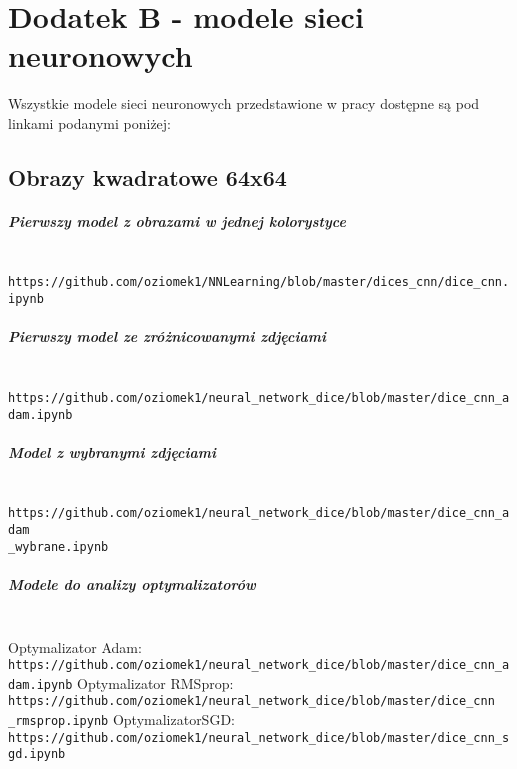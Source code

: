 
\chapter{Dodatek B - modele sieci neuronowych}

Wszystkie modele sieci neuronowych przedstawione w pracy dostępne są pod linkami
podanymi poniżej:
\section{Obrazy kwadratowe 64x64}
\paragraph{Pierwszy model z obrazami w jednej kolorystyce} \mbox{}\\
\texttt{https://github.com/oziomek1/NNLearning/blob/master/dices\_cnn/dice\_cnn.ipynb}

\paragraph{Pierwszy model ze zróżnicowanymi zdjęciami} \mbox{}\\
\texttt{https://github.com/oziomek1/neural\_network\_dice/blob/master/dice\_cnn\_adam.ipynb}

\paragraph{Model z wybranymi zdjęciami} \mbox{}\\
\texttt{https://github.com/oziomek1/neural\_network\_dice/blob/master/dice\_cnn\_adam\\\_wybrane.ipynb}

\paragraph{Modele do analizy optymalizatorów} \mbox{}\\
Optymalizator Adam:\\
\texttt{https://github.com/oziomek1/neural\_network\_dice/blob/master/dice\_cnn\_adam.ipynb}
Optymalizator RMSprop:\\
\texttt{https://github.com/oziomek1/neural\_network\_dice/blob/master/dice\_cnn\\\_rmsprop.ipynb}
OptymalizatorSGD:\\
\texttt{https://github.com/oziomek1/neural\_network\_dice/blob/master/dice\_cnn\_sgd.ipynb}

